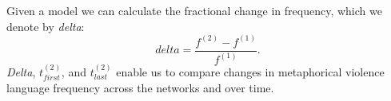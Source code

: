 Given a model we can calculate the fractional change in frequency, which we
denote by \emph{delta}: 
\begin{equation} 
  delta = \frac{f^{(2)} - f^{(1)}}{f^{(1)}}.  
  \label{eq:delta} 
\end{equation} 
\noindent \emph{Delta},
$t^{(2)}_{first}$, and $t^{(2)}_{last}$ enable us to compare changes in
metaphorical violence language frequency across the networks and over time.
